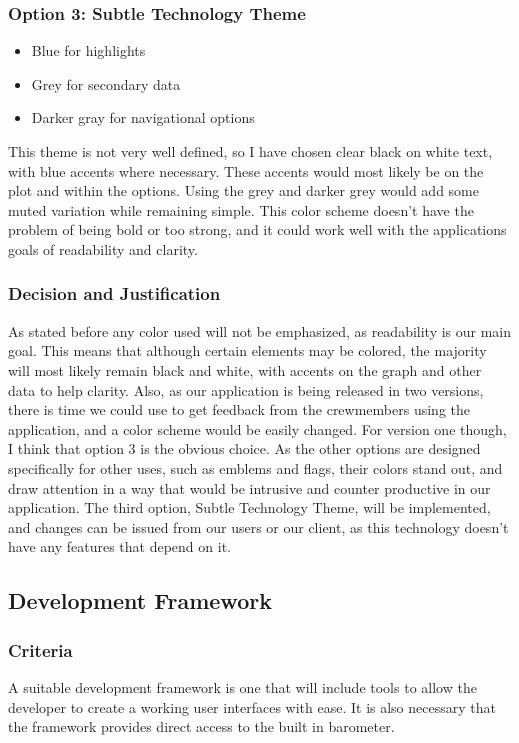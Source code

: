 \documentclass[onecolumn, draftclsnofoot,10pt, compsoc]{IEEEtran}
\begin{document}
\subsubsection{Option 3: Subtle Technology Theme}
\begin{itemize}
  \item[\fcolorbox{black}{myblue}{\rule{0pt}{6pt}\rule{6pt}{0pt}}\quad] Blue for highlights
  \item[\fcolorbox{black}{mygrey}{\rule{0pt}{6pt}\rule{6pt}{0pt}}\quad] Grey for secondary data
  \item[\fcolorbox{black}{mydarkgrey}{\rule{0pt}{6pt}\rule{6pt}{0pt}}\quad] Darker gray for navigational options
\end{itemize}
This theme is not very well defined, so I have chosen clear black on white text, with blue accents where necessary.
These accents would most likely be on the plot and within the options.
Using the grey and darker grey would add some muted variation while remaining simple.
This color scheme doesn't have the problem of being bold or too strong, and it could work well with the applications goals of readability and clarity.

\subsubsection{Decision and Justification}
As stated before any color used will not be emphasized, as readability is our main goal.
This means that although certain elements may be colored, the majority will most likely remain black and white, with accents on the graph and other data to help clarity.
Also, as our application is being released in two versions, there is time we could use to get feedback from the crewmembers using the application, and a color scheme would be easily changed.
For version one though, I think that option 3 is the obvious choice.
As the other options are designed specifically for other uses, such as emblems and flags, their colors stand out, and draw attention in a way that would be intrusive and counter productive in our application.
The third option, Subtle Technology Theme, will be implemented, and changes can be issued from our users or our client, as this technology doesn't have any features that depend on it.


\subsection{Development Framework}
\subsubsection{Criteria}
A suitable development framework is one that will include tools to allow the developer to create a working user interfaces with ease. It is also necessary that the framework provides direct access to the built in barometer.
\end{document}
